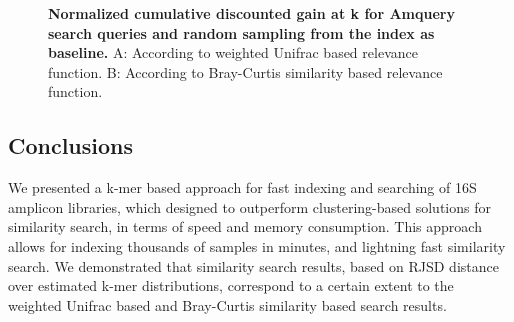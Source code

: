 \documentclass[10pt,letterpaper]{article}
\begin{document}
\begin{figure}[!h]
\caption{{\bf Normalized cumulative discounted gain at k for Amquery search queries and random sampling from the index as baseline.}
A: According to weighted Unifrac based relevance function. B: According to Bray-Curtis similarity based relevance function.}
\label{fig3}
\end{figure}


\subsection*{Conclusions}
We presented a k-mer based approach for fast indexing and searching of 16S amplicon libraries, which designed to outperform clustering-based solutions for similarity search, in terms of speed and memory consumption.
This approach allows for indexing thousands of samples in minutes, and lightning fast similarity search. We demonstrated that similarity search results, based on RJSD distance over estimated k-mer distributions, correspond to a certain extent to the weighted Unifrac based and Bray-Curtis similarity based search results.
\end{document}
